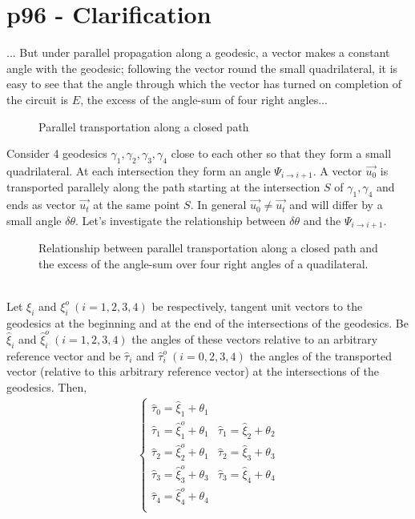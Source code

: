 \section{p96 - Clarification}
\begin{tcolorbox}
... But under parallel propagation along a geodesic, a vector makes a constant angle with the geodesic; following the vector round the small quadrilateral, it is easy to see that the angle through which the vector has turned on completion of the circuit is $E$, the excess of the angle-sum of four right angles...
\end{tcolorbox}
\begin{figure}[h]

\caption{Parallel transportation along a  closed path}
\label{fig:fig_p96_3415_a}
\end{figure}
Consider 4 geodesics $\gamma_{1}, \gamma_{2},\gamma_{3},\gamma_{4}$ close to each other so that they form a small quadrilateral. At each intersection they form an angle $\Psi_{i\rightarrow i+1}$. A vector $\overrightarrow{u_{0}}$ is transported parallely along the path starting at the intersection $S$ of $\gamma_{1},\gamma_{4}$ and ends as vector $\overrightarrow{u_{t}}$ at the same point $S$. In general $\overrightarrow{u_{0}}\ne \overrightarrow{u_{t}}$ and will differ by a small angle $\delta\theta$. Let's investigate the relationship between $\delta\theta$ and the $\Psi_{i\rightarrow i+1}$.\\
\begin{figure}[h]

\caption{Relationship between parallel transportation along a closed path and the excess of the angle-sum over four right angles of a quadilateral.}
\label{fig:fig_p96_3415_b}
\end{figure}\\
Let $\xi_{i}$ and $\xi^{o}_{i} \ (i=1,2,3,4)$ be respectively, tangent unit vectors to the  geodesics at the beginning and at the end of the intersections of the geodesics. Be $\widehat{\xi}_{i}$ and $\widehat{\xi}^{o}_{i} \ (i=1,2,3,4)$ the angles of these vectors relative to an arbitrary reference vector and be $\widehat{\tau}_{i}$ and $\widehat{\tau}^{o}_{i} \ (i=0,2,3,4)$ the angles of the transported vector (relative to this arbitrary reference vector) at the intersections of the geodesics.
Then,
\begin{align}
\left \{ \begin{array}{ll}
\widehat{\tau}_{0} = \widehat{\xi}_{1}+\theta_{1}&\\
\widehat{\tau}_{1} = \widehat{\xi}^{o}_{1}+\theta_{1}&\widehat{\tau}_{1} = \widehat{\xi}_{2}+\theta_{2}\\
\widehat{\tau}_{2} = \widehat{\xi}^{o}_{2}+\theta_{1}&\widehat{\tau}_{2} = \widehat{\xi}_{3}+\theta_{3}\\
\widehat{\tau}_{3} = \widehat{\xi}^{o}_{3}+\theta_{3}&\widehat{\tau}_{3} = \widehat{\xi}_{4}+\theta_{4}\\
\widehat{\tau}_{4} = \widehat{\xi}^{o}_{4}+\theta_{4}&\\
\end{array} \right.
\end{align}
